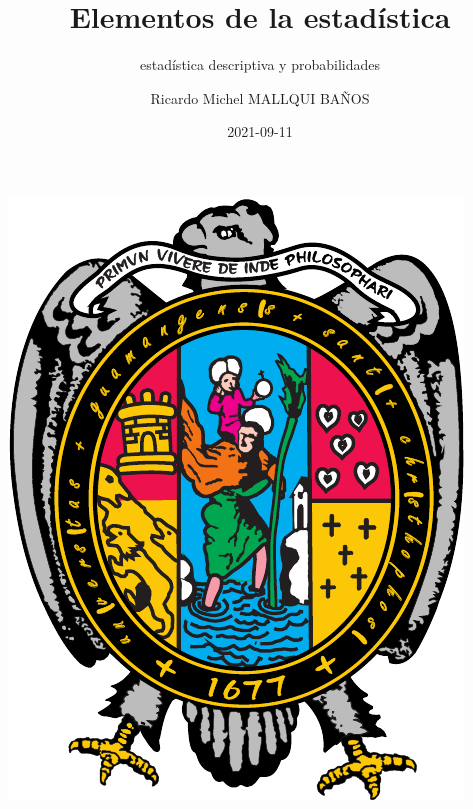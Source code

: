 \documentclass[
  10pt,
]{krantz}
\title{Elementos de la estadística}
\subtitle{estadística descriptiva y probabilidades}
\author{Ricardo Michel MALLQUI BAÑOS}
\date{2021-09-11}
\let\oldincludegraphics\includegraphics
\renewcommand\includegraphics[2][]{%
  \oldincludegraphics[scale=0.85]{#2}
}
\theoremstyle{definition}
\theoremstyle{definition}
\theoremstyle{definition}
\theoremstyle{definition}
\theoremstyle{remark}
\begin{document}
\maketitle

\thispagestyle{empty}
\begin{center}
\includegraphics{U.pdf}
\end{center}


{
\hypersetup{linkcolor=}
\setcounter{tocdepth}{2}
\tableofcontents
}
\listoftables
\listoffigures
\newcommand{\N}{\mathbb{N}}
\newcommand{\R}{\mathbb{R}}
\newcommand{\CC}{\mathbb{C}}
\newcommand{\I}{\mathbb{I}}
\newcommand{\f}{\mathbb{f}}
\newcommand{\X}{\mathbb{X}}
\newcommand{\D}{\mathbb{D}}
\newcommand{\Z}{\mathbb{Z}}
\newcommand{\Q}{\mathbb{Q}}
\newcommand{\norm}[1]{\left\Vert#1\right\Vert}
\newcommand{\abs}[1]{\left\vert#1\right\vert}
\newcommand{\set}[1]{\left\{#1\right\}}
\newcommand{\seq}[1]{\left<#1\right>}
\newcommand{\co}[1]{\left[#1\right]}
\newcommand{\cc}[1]{\left(#1\right)}
\newcommand{\J}{\mathcal{J}}
\newcommand{\K}{\mathcal{K}}
\newcommand{\M}{\mathcal{M}}
\newcommand{\F}{\mathcal{F}}
\end{document}
